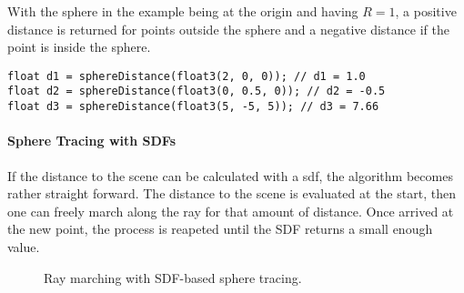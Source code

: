 \noindent
With the sphere in the example being at the origin and having $R = 1$, a positive distance is returned for points outside the sphere and a negative distance if the point is inside the sphere.
\begin{lstlisting}[language=HLSL]
float d1 = sphereDistance(float3(2, 0, 0)); // d1 = 1.0
float d2 = sphereDistance(float3(0, 0.5, 0)); // d2 = -0.5
float d3 = sphereDistance(float3(5, -5, 5)); // d3 = 7.66
\end{lstlisting}

\paragraph{Sphere Tracing with SDFs}
If the distance to the scene can be calculated with a \gls{sdf}, the algorithm becomes rather straight forward. The distance to the scene is evaluated at the start, then one can freely march along the ray for that amount of distance. Once arrived at the new point, the process is reapeted until the SDF returns a small enough value.

\begin{figure}[H]
    \centering
    \caption{Ray marching with SDF-based sphere tracing.}
    \label{hlsl:raymarch:spheretracing}
\end{figure}

